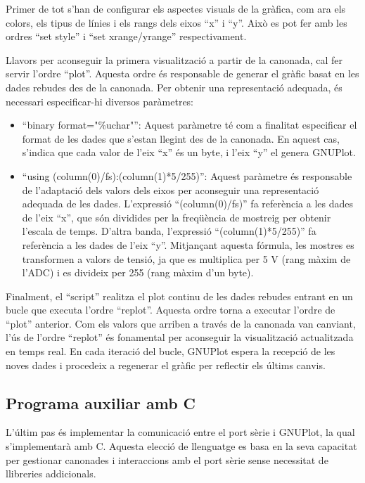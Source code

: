 \documentclass{tfgitic}[2023/06/30]
\begin{document}
Primer de tot s'han de configurar els aspectes visuals de la gràfica,
com ara els colors, els tipus de línies i els rangs dels eixos ``x'' i
``y''. Això es pot fer amb les ordres ``set style'' i ``set
xrange/yrange'' respectivament.

Llavors per aconseguir la primera visualització a partir de la
canonada, cal fer servir l'ordre ``plot''. Aquesta ordre és
responsable de generar el gràfic basat en les dades rebudes des de la
canonada. Per obtenir una representació adequada, és necessari
especificar-hi diversos paràmetres:

\begin{itemize}
	\item ``binary format="\%uchar"'': Aquest paràmetre té com a
          finalitat especificar el format de les dades que s'estan
          llegint des de la canonada. En aquest cas, s'indica que cada
          valor de l'eix ``x'' és un byte, i l'eix ``y'' el genera
          GNUPlot.
	\item ``using (column(0)/fs):(column(1)*5/255)'': Aquest
          paràmetre és responsable de l'adaptació dels valors dels
          eixos per aconseguir una representació adequada de les
          dades. L'expressió ``(column(0)/fs)'' fa referència a les
          dades de l'eix ``x'', que són dividides per la freqüència de
          mostreig per obtenir l'escala de temps. D'altra banda,
          l'expressió ``(column(1)*5/255)'' fa referència a les dades
          de l'eix ``y''. Mitjançant aquesta fórmula, les mostres es
          transformen a valors de tensió, ja que es multiplica per 5 V
          (rang màxim de l'ADC) i es divideix per 255 (rang màxim d'un
          byte).
\end{itemize}

Finalment, el ``script'' realitza el plot continu de les dades rebudes
entrant en un bucle que executa l'ordre ``replot''. Aquesta ordre
torna a executar l'ordre de ``plot'' anterior. Com els valors que
arriben a través de la canonada van canviant, l'ús de l'ordre
``replot'' és fonamental per aconseguir la visualització actualitzada
en temps real. En cada iteració del bucle, GNUPlot espera la recepció
de les noves dades i procedeix a regenerar el gràfic per reflectir els
últims canvis.

\subsection{Programa auxiliar amb C}

L'últim pas és implementar la comunicació entre el port sèrie i
GNUPlot, la qual s'implementarà amb C. Aquesta elecció de llenguatge
es basa en la seva capacitat per gestionar canonades i interaccions
amb el port sèrie sense necessitat de llibreries addicionals.
\end{document}
